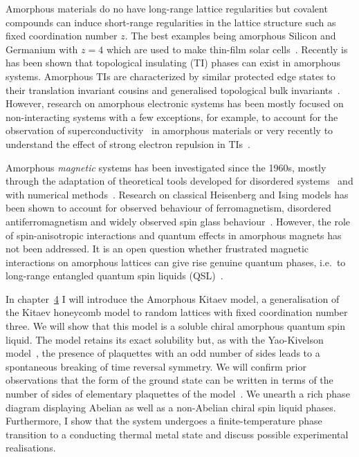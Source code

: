Amorphous materials do no have long-range lattice regularities but covalent compounds can induce short-range regularities in the lattice structure such as fixed coordination number \(z\). The best examples being amorphous Silicon and Germanium with \(z=4\) which are used to make thin-film solar cells~\autocite{Weaire1971,betteridge1973possible}. Recently is has been shown that topological insulating (TI) phases can exist in amorphous systems. Amorphous TIs are characterized by similar protected edge states to their translation invariant cousins and generalised topological bulk invariants~\autocite{mitchellAmorphousTopologicalInsulators2018,agarwala2019topological,marsalTopologicalWeaireThorpeModels2020,costa2019toward,agarwala2020higher,spring2021amorphous,corbae2019evidence}. However, research on amorphous electronic systems has been mostly focused on non-interacting systems with a few exceptions, for example, to account for the observation of superconductivity~\autocite{buckel1954einfluss,mcmillan1981electron,meisel1981eliashberg,bergmann1976amorphous,mannaNoncrystallineTopologicalSuperconductors2022} in amorphous materials or very recently to understand the effect of strong electron repulsion in TIs~\autocite{kim2022fractionalization}.

Amorphous \emph{magnetic} systems has been investigated since the 1960s, mostly through the adaptation of theoretical tools developed for disordered systems~\autocite{aharony1975critical,Petrakovski1981,kaneyoshi1992introduction,Kaneyoshi2018} and with numerical methods~\autocite{fahnle1984monte,plascak2000ising}. Research on classical Heisenberg and Ising models has been shown to account for observed behaviour of ferromagnetism, disordered antiferromagnetism and widely observed spin glass behaviour~\autocite{coey1978amorphous}. However, the role of spin-anisotropic interactions and quantum effects in amorphous magnets has not been addressed. It is an open question whether frustrated magnetic interactions on amorphous lattices can give rise genuine quantum phases, i.e.~to long-range entangled quantum spin liquids (QSL)~\autocite{Anderson1973,Knolle2019,Savary2016,Lacroix2011}.

In chapter~\protect\hyperlink{chap:4-the-amorphous-kitaev-model}{4} I will introduce the Amorphous Kitaev model, a generalisation of the Kitaev honeycomb model to random lattices with fixed coordination number three. We will show that this model is a soluble chiral amorphous quantum spin liquid. The model retains its exact solubility but, as with the Yao-Kivelson model~\autocite{yaoExactChiralSpin2007}, the presence of plaquettes with an odd number of sides leads to a spontaneous breaking of time reversal symmetry. We will confirm prior observations that the form of the ground state can be written in terms of the number of sides of elementary plaquettes of the model~\autocite{OBrienPRB2016,eschmannThermodynamicClassificationThreedimensional2020}. We unearth a rich phase diagram displaying Abelian as well as a non-Abelian chiral spin liquid phases. Furthermore, I show that the system undergoes a finite-temperature phase transition to a conducting thermal metal state and discuss possible experimental realisations.

